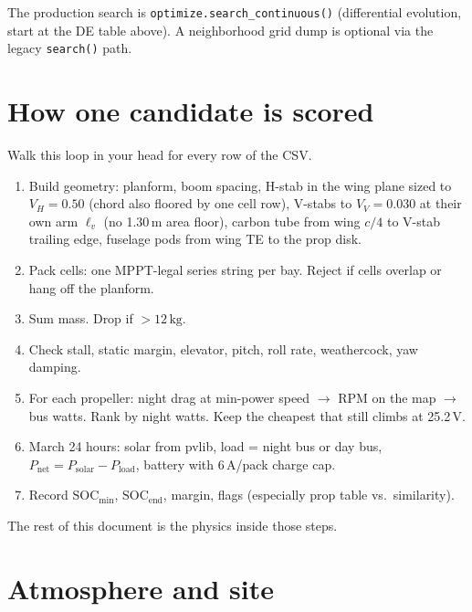 \documentclass[11pt,letterpaper]{article}
\newcommand{\code}[1]{\texttt{#1}}
\begin{document}
The production search is \code{optimize.search\_continuous()} (differential evolution, start at the DE table above). A neighborhood grid dump is optional via the legacy \code{search()} path.

\section{How one candidate is scored}

Walk this loop in your head for every row of the CSV.

\begin{enumerate}
  \item Build geometry: planform, boom spacing, H-stab in the wing plane sized to $V_H = 0.50$ (chord also floored by one cell row), V-stabs to $V_V = 0.030$ at their own arm $\ell_v$ (no 1.30\,m area floor), carbon tube from wing $c/4$ to V-stab trailing edge, fuselage pods from wing TE to the prop disk.
  \item Pack cells: one MPPT-legal series string per bay. Reject if cells overlap or hang off the planform.
  \item Sum mass. Drop if $>12\,\mathrm{kg}$.
  \item Check stall, static margin, elevator, pitch, roll rate, weathercock, yaw damping.
  \item For each propeller: night drag at min-power speed $\to$ RPM on the map $\to$ bus watts. Rank by night watts. Keep the cheapest that still climbs at 25.2\,V.
  \item March 24 hours: solar from pvlib, load = night bus or day bus, $P_\mathrm{net} = P_\mathrm{solar} - P_\mathrm{load}$, battery with 6\,A/pack charge cap.
  \item Record $\mathrm{SOC}_\mathrm{min}$, $\mathrm{SOC}_\mathrm{end}$, margin, flags (especially prop table vs.\ similarity).
\end{enumerate}

The rest of this document is the physics inside those steps.

\section{Atmosphere and site}
\end{document}
